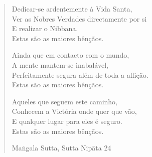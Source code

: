 \begin{verse}
Dedicar-se ardentemente à Vida Santa,\\
Ver as Nobres Verdades directamente por si\\
E realizar o Nibbana.\\
Estas são as maiores bênçãos.

Ainda que em contacto com o mundo,\\
A mente mantem-se inabalável,\\
Perfeitamente segura além de toda a aflição.\\
Estas são as maiores bênçãos.

Aqueles que seguem este caminho,\\
Conhecem a Victória onde quer que vão,\\
E qualquer lugar para eles é seguro.\\
Estas são as maiores bênçãos.

{\raggedleft
Maṅgala Sutta, Sutta Nipāta 24
\par}

\end{verse}


